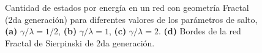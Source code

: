 \begin{figure}[h!]
\begin{subfigure}[b!]{0.25 \textwidth}
    \end{subfigure}\hspace*{-0.5em} \vspace*{-0.5em}
        \caption{Cantidad de estados por energía en un red con geometría Fractal (2da generación) para diferentes valores de los parámetros de salto, \textbf{(a)} $\gamma /\lambda = 1/2$, \textbf{
        (b)} $\gamma /\lambda = 1$, \textbf{(c)} $\gamma /\lambda = 2$. \textbf{(d)} Bordes de la red Fractal de Sierpinski de 2da generación.}
    \label{fig:Dos_fractal}
\end{figure}